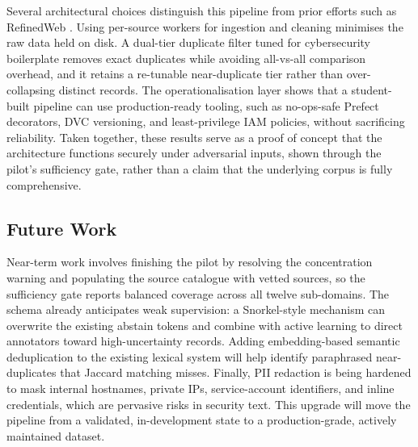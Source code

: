 \documentclass[conference]{IEEEtran}
\begin{document}
Several architectural choices distinguish this pipeline from prior efforts such as RefinedWeb \cite{penedo2023refinedweb}. Using per-source workers for ingestion and cleaning minimises the raw data held on disk. A dual-tier duplicate filter tuned for cybersecurity boilerplate removes exact duplicates while avoiding all-vs-all comparison overhead, and it retains a re-tunable near-duplicate tier rather than over-collapsing distinct records. The operationalisation layer shows that a student-built pipeline can use production-ready tooling, such as no-ops-safe Prefect decorators, DVC versioning, and least-privilege IAM policies, without sacrificing reliability. Taken together, these results serve as a proof of concept that the architecture functions securely under adversarial inputs, shown through the pilot's sufficiency gate, rather than a claim that the underlying corpus is fully comprehensive.

\subsection{Future Work}

Near-term work involves finishing the pilot by resolving the concentration warning and populating the source catalogue with vetted sources, so the sufficiency gate reports balanced coverage across all twelve sub-domains. The schema already anticipates weak supervision: a Snorkel-style mechanism can overwrite the existing abstain tokens and combine with active learning to direct annotators toward high-uncertainty records. Adding embedding-based semantic deduplication \cite{abbas2023semdedup} to the existing lexical system will help identify paraphrased near-duplicates that Jaccard matching misses. Finally, PII redaction is being hardened to mask internal hostnames, private IPs, service-account identifiers, and inline credentials, which are pervasive risks in security text. This upgrade will move the pipeline from a validated, in-development state to a production-grade, actively maintained dataset.
\end{document}
